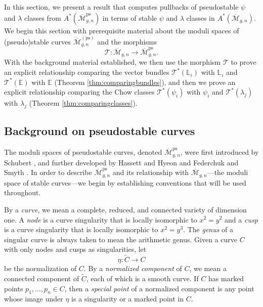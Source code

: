 \documentclass[12pt]{amsart}
\newcounter{intro}[section]
\theoremstyle{definition}
\newcommand{\M}{\overline{\mathcal{M}}}
\newcommand{\ps}{\mathrm{ps}}
\newcommand{\T}{\mathcal{T}}
\newcommand{\bE}{\mathbb{E}}
\renewcommand{\L}{\mathbb{L}}
\numberwithin{equation}{section}
\begin{document}
In this section, we present a result that computes pullbacks of pseudostable $\psi$ and $\lambda$ classes from $A^*(\M_{g,n}^\ps)$ in terms of stable $\psi$  and $\lambda$ classes in $A^*(\M_{g,n})$. We begin this section with prerequisite material about the moduli spaces of (pseudo)stable curves $\M_{g,n}^{(\ps)}$ and the morphisms
\[
\T:\M_{g,n}\rightarrow\M_{g,n}^\ps.
\]
With the background material established, we then use the morphism $\T$ to prove an explicit relationship comparing the vector bundles $\T^*(\L_i)$ with $\L_i$ and $\T^*(\bE)$ with $\bE$ (Theorem \ref{thm:comparingbundles}), and then we prove an explicit relationship comparing the Chow classes $\T^*(\psi_i)$ with $\psi_i$ and $\T^*(\lambda_j)$ with $\lambda_j$ (Theorem \ref{thm:comparingclasses}).

\subsection{Background on pseudostable curves} 

The moduli spaces of pseudostable curves, denoted $\M_{g,n}^{\ps}$, were first introduced by Schubert \cite{Schubert}, and further developed by Hassett and Hyeon \cite{HH} and Federchuk and Smyth \cite{FS}. In order to describe $\M_{g,n}^\ps$ and its relationship with $\M_{g,n}$---the moduli space of stable curves---we begin by establishing conventions that will be used throughout. 

By a \emph{curve}, we mean a complete, reduced, and connected variety of dimension one. A \emph{node} is a curve singularity that is locally isomorphic to $x^2=y^2$ and a \emph{cusp} is a curve singularity that is locally isomorphic to $x^2=y^3$. The \emph{genus} of a singular curve is always taken to mean the arithmetic genus. Given a curve $C$ with only nodes and cusps as singularities, let 
\[
\eta:\widetilde C\rightarrow C
\]
be the normalization of $C$. By a \emph{normalized component} of $C$, we mean a connected component of $\widetilde C$, each of which is a smooth curve. If $C$ has marked points $p_1,\dots,p_n\in C$, then a \emph{special point} of a normalized component is any point whose image under $\eta$ is a singularity or a marked point in $C$.
\end{document}
